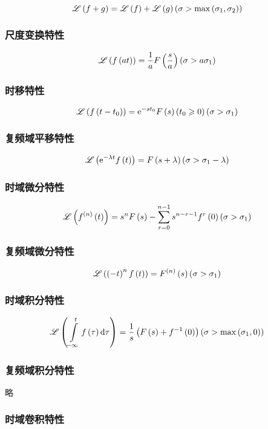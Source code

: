 \documentclass{article}
\begin{document}
\[\mathscr L\left(f+g\right)=\mathscr L\left(f\right)+\mathscr L\left(g\right)
    \left(\sigma>\max\left(\sigma_1,\sigma_2\right)\right)\]

\subsubsection{尺度变换特性}

\[\mathscr L\left(f\left(at\right)\right)=\frac1aF\left(\frac sa\right)
    \left(\sigma>a\sigma_1\right)\]

\subsubsection{时移特性}

\[\mathscr L\left(f\left(t-t_0\right)\right)=\mathrm e^{-st_0}F\left(s\right)\left(t_0\geqslant0\right)
    \left(\sigma>\sigma_1\right)\]

\subsubsection{复频域平移特性}

\[\mathscr L\left(\mathrm e^{-\lambda t}f\left(t\right)\right)=F\left(s+\lambda\right)
    \left(\sigma>\sigma_1-\lambda\right)\]

\subsubsection{时域微分特性}

\[\mathscr L\left(f^{\left(n\right)}\left(t\right)\right)=s^nF\left(s\right)-\sum_{r=0}^{n-1}s^{n-r-1}f^r\left(0\right)
    \left(\sigma>\sigma_1\right)\]

\subsubsection{复频域微分特性}

\[\mathscr L\left(\left(-t\right)^nf\left(t\right)\right)=F^{\left(n\right)}\left(s\right)
    \left(\sigma>\sigma_1\right)\]

\subsubsection{时域积分特性}

\[\mathscr L\left(\int\limits_{-\infty}^tf\left(\tau\right)\mathrm d\tau\right)=
    \frac1s\left(F\left(s\right)+f^{-1}\left(0\right)\right)
    \left(\sigma>\max\left(\sigma_1,0\right)\right)\]

\subsubsection{复频域积分特性}

略

\subsubsection{时域卷积特性}
\end{document}
